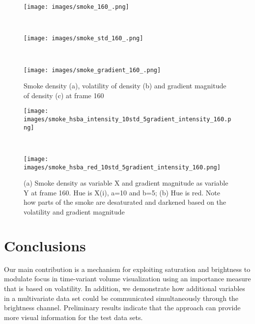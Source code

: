 \begin{figure}
\centering
\begin{minipage}{.33\textwidth}
\texttt{[image: images/smoke\_160\_.png]}
\subcaption{}
\end{minipage}~
\begin{minipage}{.33\textwidth}
\texttt{[image: images/smoke\_std\_160\_.png]}
\subcaption{}
\end{minipage}~
\begin{minipage}{.33\textwidth}
\texttt{[image: images/smoke\_gradient\_160\_.png]}
\subcaption{}
\end{minipage}
\caption{Smoke density (a), volatility of density (b) and gradient magnitude of density (c) at frame 160}
\label{fig:smoke_gray}
\end{figure}

\begin{figure}
\centering
\begin{minipage}{.33\textwidth}
\texttt{[image: images/smoke\_hsba\_intensity\_10std\_5gradient\_intensity\_160.png]}
\subcaption{}
\end{minipage}~
\begin{minipage}{.33\textwidth}
\texttt{[image: images/smoke\_hsba\_red\_10std\_5gradient\_intensity\_160.png]}
\subcaption{}
\end{minipage}
\caption[Smoke density as variable X and gradient magnitude as variable Y at frame 160]{(a) Smoke density as variable X and gradient magnitude as variable Y at frame 160. Hue is X(i), a=10 and b=5; (b) Hue is red. Note how parts of the smoke are desaturated and darkened based on the volatility and gradient magnitude}
\label{fig:smoke_hsba}
\end{figure}

\section{Conclusions}
Our main contribution is a mechanism for exploiting saturation and brightness to modulate focus in time-variant volume visualization using an importance measure that is based on volatility. In addition, we demonstrate how additional variables in a multivariate data set could be communicated simultaneously through the brightness channel. Preliminary results indicate that the approach can provide more visual information for the test data sets.


